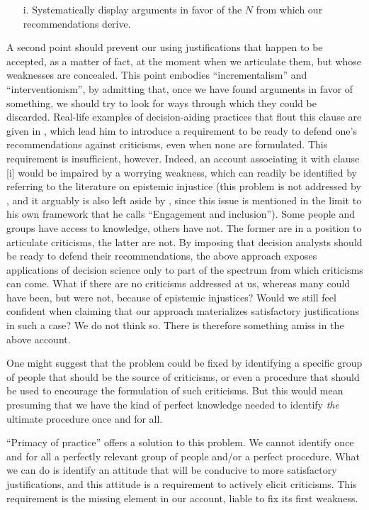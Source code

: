 \documentclass[preprint, french, english, 11pt, authoryear]{elsarticle}%
\begin{document}
\begin{itemize}
\item[i.]	Systematically display arguments in favor of the $N$ from which our recommendations derive.
\end{itemize}
A second point should prevent our using justifications that happen to be accepted, as a matter of fact, at the moment when we articulate them, but whose weaknesses are concealed. This point embodies “incrementalism” and ``interventionism'', by admitting that, once we have found arguments in favor of something, we should try to look for ways through which they could be discarded. Real-life examples of decision-aiding practices that flout this clause are given in \cite{meinard_what_2017}, which lead him to introduce a requirement to be ready to defend one's recommendations against criticisms, even when none are formulated. This requirement is insufficient, however. Indeed, an account associating it with clause [i] would be impaired by a worrying weakness, which can readily be identified by referring to the literature on epistemic injustice \citep{fricker_epistemic_2007} (this problem is not addressed by \cite{meinard_what_2017}, and it arguably is also left aside by \cite{mingers_ethics_2011}, since this issue is mentioned in the limit to his own framework that he calls ``Engagement and inclusion''). Some people and groups have access to knowledge, others have not. The former are in a position to articulate criticisms, the latter are not. By imposing that decision analysts should be ready to defend their recommendations, the above approach exposes applications of decision science only to part of the spectrum from which criticisms can come. What if there are no criticisms addressed at us, whereas many could have been, but were not, because of epistemic injustices? Would we still feel confident when claiming that our approach materializes satisfactory justifications in such a case? We do not think so. There is therefore something amiss in the above account.

One might suggest that the problem could be fixed by identifying a specific group of people that should be the source of criticisms, or even a procedure that should be used to encourage the formulation of such criticisms. But this would mean presuming that we have the kind of perfect knowledge needed to identify \emph{the} ultimate procedure once and for all.

``Primacy of practice” offers a solution to this problem. We cannot identify once and for all a perfectly relevant group of people and/or a perfect procedure. What we can do is identify an attitude that will be conducive to more satisfactory justifications, and this attitude is a requirement to actively elicit criticisms. This requirement is the missing element in our account, liable to fix its first weakness.
\end{document}
